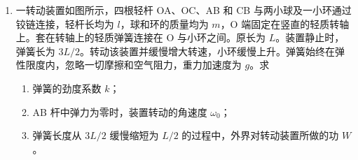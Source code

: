 \documentclass[\gkver]{gaokaozhenti}
\begin{document}
\begin{enumerate}
\begin{enumerate}
	\item
	该圈肌肉组织的电阻 $R$；

	\item
	该圈肌肉组织中的感应电动势 $E$；

	\item
	$0.3\Us$ 内该圈肌肉组织中产生的热量 $Q$。
\end{enumerate}


\item
一转动装置如图所示，四根轻杆 OA、OC、AB 和 CB 与两小球及一小环通过铰链连接，轻杆长均为 $l$，球和环的质量均为 $m$，O 端固定在竖直的轻质转轴上。套在转轴上的轻质弹簧连接在 O 与小环之间。原长为 $L$。装置静止时，弹簧长为 $3L/2$。转动该装置并缓慢增大转速，小环缓慢上升。弹簧始终在弹性限度内，忽略一切摩擦和空气阻力，重力加速度为 $g$。求


\begin{enumerate}
	\item
	弹簧的劲度系数 $k$；

	\item
	AB 杆中弹力为零时，装置转动的角速度 $\omega_{0}$；

	\item
	弹簧长度从 $3L/2$ 缓慢缩短为 $L/2$ 的过程中，外界对转动装置所做的功 $W$。
\end{enumerate}

\end{enumerate}
\end{document}
